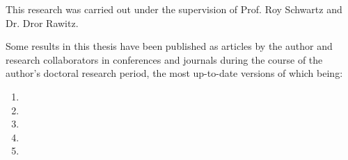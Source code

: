 This research was carried out under the supervision of Prof. Roy Schwartz and Dr. Dror Rawitz.

Some results in this thesis have been published as articles by the author and research collaborators in conferences and journals during the course of the author’s doctoral research period, the most up-to-date versions of which being:



\begin{enumerate}
    \item {}
    \item {}
    \item {}
    \item {}
    \item {}
\end{enumerate}
